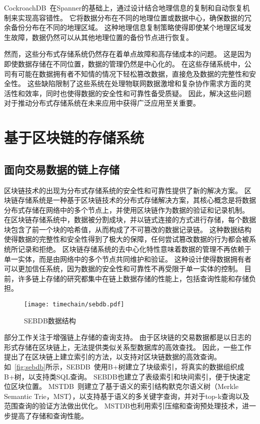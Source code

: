 CockroachDB~\cite{taft2020cockroachdb}在Spanner的基础上，通过设计结合地理信息的复制和自动恢复机制来实现高容错性。
它将数据分布在不同的地理位置或数据中心，确保数据的冗余备份分布在不同的地理区域。
这种地理信息复制策略使得即使某个地理区域发生故障，数据仍然可以从其他地理位置的备份节点进行恢复。

然而，这些分布式存储系统仍然存在着单点故障和高存储成本的问题。
这是因为即使数据存储在不同位置，数据的管理仍然是中心化的。
在这些存储系统中，公司有可能在数据拥有者不知情的情况下轻松篡改数据，直接危及数据的完整性和安全性。
这些缺陷限制了这些系统在处理物联网数据激增和复杂协作需求方面的灵活性和效率，同时也使得数据的安全性和可靠性备受质疑。
因此，解决这些问题对于推动分布式存储系统在未来应用中获得广泛应用至关重要。

\section{基于区块链的存储系统}

\subsection{面向交易数据的链上存储}
区块链技术的出现为分布式存储系统的安全性和可靠性提供了新的解决方案。
区块链存储系统是一种基于区块链技术的分布式存储解决方案，其核心概念是将数据分布式存储在网络中的多个节点上，并使用区块链作为数据的验证和记录机制。
在区块链存储系统中，数据被分割成块，并以链式连接的方式进行存储，每个数据块包含了前一个块的哈希值，从而构成了不可篡改的数据记录链。
这种数据结构使得数据的完整性和安全性得到了极大的保障，任何尝试篡改数据的行为都会被系统所记录和拒绝。
区块链存储系统的去中心化特性意味着数据的管理不再依赖于单一实体，而是由网络中的多个节点共同维护和验证。
这种设计使得数据拥有者可以更加信任系统，因为数据的安全性和可靠性不再受限于单一实体的控制。
目前，许多链上存储的研究都集中在链上数据存储的性能上，包括查询性能和存储负担。

\begin{figure}[t]
    \centering
    \texttt{[image: timechain/sebdb.pdf]}
    \caption{SEBDB数据结构}
    \label{fig:sebdb}
\end{figure}

部分工作关注于增强链上存储的查询支持。
由于区块链的交易数据都是以日志的形式存储在区块链上，无法提供类似关系型数据库的高效查找。
因此，一些工作提出了在区块链上建立索引的方法，以支持对区块链数据的高效查询。
如~\autoref{fig:sebdb}所示，SEBDB~\cite{zhu2019sebdb}使用B+树建立了块级索引，将真实的数据组织成B+树，以支持类SQL查询。
SEBDB也建立了表级索引和块间索引，便于快速定位区块位置。
MSTDB~\cite{zhou2022mstdb}则建立了基于语义的索引结构默克尔语义树（Merkle Semantic Trie，MST），以支持基于语义的多关键字查询，并对于top-k查询以及范围查询的验证方法做出优化。
MSTDB也利用索引压缩和查询预处理技术，进一步提高了存储和查询性能。

